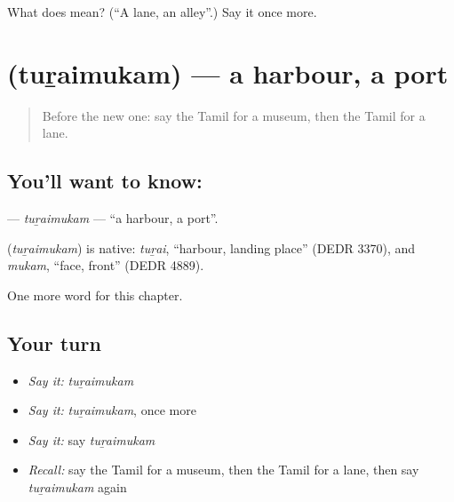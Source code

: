 \begin{tcolorbox}[breakable,colback=teal!4,colframe=teal!35!black,title={Before you move on}]
What does  mean? (\textquotedblleft{}A lane, an alley\textquotedblright{}.) Say it once more.
\end{tcolorbox}
\section[\texorpdfstring{\ta{துறைமுகம்} (tuṟaimukam)}{துறைமுகம் (tuṟaimukam)}]{ (tuṟaimukam) — a harbour, a port}

\label{lesson:TA-C236-turaimukam}



\begin{quote}
Before the new one: say the Tamil for a museum, then the Tamil for a lane.
\end{quote}

\subsection*{You'll want to know: }
\textbf{} — \emph{tuṟaimukam} — \textquotedblleft{}a harbour, a port\textquotedblright{}.

\begin{cousinweb}
\textbf{} (\emph{tuṟaimukam}) is native: \emph{tuṟai}, \textquotedblleft{}harbour, landing place\textquotedblright{} (DEDR 3370), and \emph{mukam}, \textquotedblleft{}face, front\textquotedblright{} (DEDR 4889).
\end{cousinweb}

\begin{grammarlens}[title={What you've built}]
One more word for this chapter.
\end{grammarlens}

\subsection*{Your turn}
\begin{itemize}
\raggedright
  \item \emph{Say it:} \emph{tuṟaimukam}
  \item \emph{Say it:} \emph{tuṟaimukam}, once more
  \item \emph{Say it:} say \emph{tuṟaimukam}
  \item \emph{Recall:} say the Tamil for a museum, then the Tamil for a lane, then say \emph{tuṟaimukam} again
\end{itemize}

